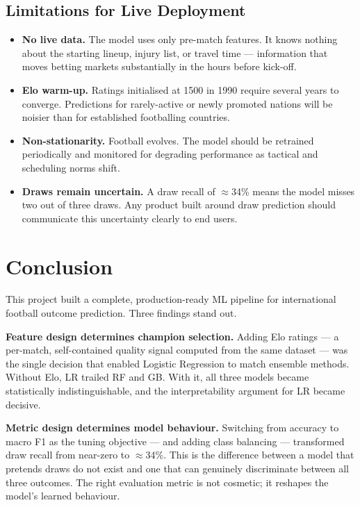 \documentclass[12pt,a4paper,openany]{report}
\begin{document}
\section{Limitations for Live Deployment}

\begin{itemize}
  \item \textbf{No live data.} The model uses only pre-match features. It knows nothing
  about the starting lineup, injury list, or travel time --- information that
  moves betting markets substantially in the hours before kick-off.

  \item \textbf{Elo warm-up.} Ratings initialised at 1500 in 1990 require several years
  to converge. Predictions for rarely-active or newly promoted nations will
  be noisier than for established footballing countries.

  \item \textbf{Non-stationarity.} Football evolves. The model should be retrained
  periodically and monitored for degrading performance as tactical and
  scheduling norms shift.

  \item \textbf{Draws remain uncertain.} A draw recall of $\approx$34\% means the model misses
  two out of three draws. Any product built around draw prediction should
  communicate this uncertainty clearly to end users.
\end{itemize}

\chapter{Conclusion}

This project built a complete, production-ready ML pipeline for international
football outcome prediction. Three findings stand out.

\medskip
\textbf{Feature design determines champion selection.} Adding Elo ratings --- a
per-match, self-contained quality signal computed from the same dataset --- was
the single decision that enabled Logistic Regression to match ensemble methods.
Without Elo, LR trailed RF and GB. With it, all three models became
statistically indistinguishable, and the interpretability argument for LR
became decisive.

\medskip
\textbf{Metric design determines model behaviour.} Switching from accuracy to macro
F1 as the tuning objective --- and adding class balancing --- transformed draw
recall from near-zero to $\approx$34\%. This is the difference between a model that
pretends draws do not exist and one that can genuinely discriminate between
all three outcomes. The right evaluation metric is not cosmetic; it reshapes
the model's learned behaviour.
\end{document}
